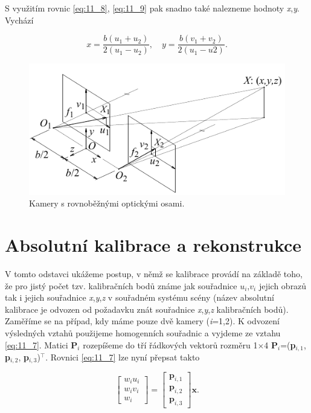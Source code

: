 S využitím rovnic \eqref{eq:11_8}, \eqref{eq:11_9} pak snadno také nalezneme hodnoty \textit{x},\textit{y}. Vychází 

\begin{equation} \label{eq:11_11}
    x = \frac{b(u_1 + u_2)}{2(u_1 - u_2)}, \quad y = \frac{b(v_1 + v_2)}{2(u_1 - u2)}.
\end{equation}

\begin{figure}[th]
    \begin{center}
        \includegraphics[scale=.9]{11_stereo/images/img_11_3.pdf}
    \end{center}
    \caption{Kamery s rovnoběžnými optickými osami.}
    \label{img:11_3}
\end{figure}

\section*{Absolutní kalibrace a rekonstrukce}

V tomto odstavci ukážeme postup, v němž se kalibrace provádí na základě toho, že pro jistý počet tzv. kalibračních bodů známe jak souřadnice $u_i$,$v_i$ jejich obrazů tak i jejich souřadnice \textit{x},\textit{y},\textit{z} v souřadném systému scény (název absolutní kalibrace je odvozen od požadavku znát souřadnice \textit{x},\textit{y},\textit{z} kalibračních bodů). Zaměříme se na případ, kdy máme pouze dvě kamery (\textit{i}=1,2). K odvození výsledných vztahů použijeme homogenních souřadnic a vyjdeme ze vztahu \eqref{eq:11_7}. Matici \textbf{P}$_{i}$ rozepíšeme do tří řádkových vektorů rozměru 1$\times$4 \textbf{P}$_{i}$=(\textbf{p}$_{i,1}$, \textbf{p}$_{i,2}$, \textbf{p}$_{i,3}$)$^\top$. Rovnici \eqref{eq:11_7} lze nyní přepsat takto

\begin{equation} \label{eq:11_12}
    \left[
    \begin{array}{c}
    {w_{i} u_{i} } \\
    {w_{i} v_{i} } \\
    {w_{i} }
    \end{array}
    \right]
    =
    \left[
    \begin{array}{c}
    {\mathbf{p}_{i,1} } \\
    {\mathbf{p}_{i,2} } \\
    {\mathbf{p}_{i,3} }
    \end{array}
    \right]
    \mathbf{x}.
\end{equation}

